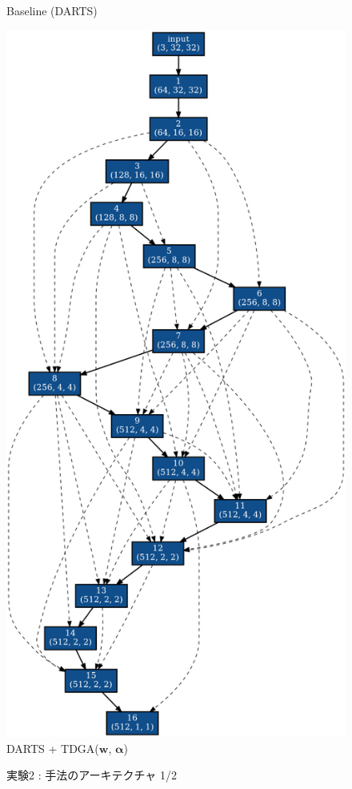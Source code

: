 \begin{figure}[tb]
\begin{minipage}{0.49\hsize}
\begin{center}
    Baseline (DARTS)
 	\end{center}
 \end{minipage}
 \begin{minipage}{0.49\hsize}
 	\begin{center}
    \includegraphics[clip,scale=0.2]{./fig/04.exp/nofix_last.png}\\
    DARTS + TDGA($\bm{w}$, $\bm{\alpha}$)
 	\end{center}
 \end{minipage}
 \caption{実験2 : 手法のアーキテクチャ 1/2}
 \label{fig:exp2/archi}
\end{figure}

